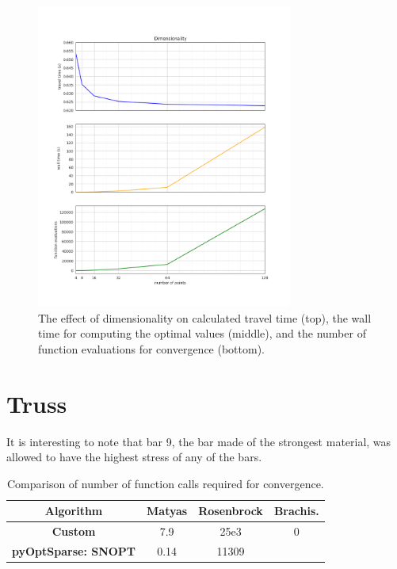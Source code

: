 \documentclass{article}
\begin{document}
\begin{figure}[htbp]
	\centering
	\includegraphics[width=0.75\textwidth]{figures/dimensions.png}
	\caption{The effect of dimensionality on calculated travel time (top), the wall time for computing the optimal values (middle), and the number of function evaluations for convergence (bottom).}
	\label{fig:results}
\end{figure}


\section{Truss}
It is interesting to note that bar 9, the bar made of the strongest material, was allowed to have the highest stress of any of the bars.

\begin{table}[htb]
	\begin{center}
        \caption{Comparison of number of function calls required for convergence.\label{tab:mytable}}
		\begin{tabular}{c|c|c|c}
			\toprule
			\textbf{Algorithm} & Matyas & Rosenbrock & Brachis. \\
			\midrule
			\textbf{Custom} & 7.9 & 25e3 & 0 \\
			\textbf{pyOptSparse: SNOPT} & 0.14 & 11309 \\
			\bottomrule
		\end{tabular}
	\end{center}
\end{table}
\end{document}

